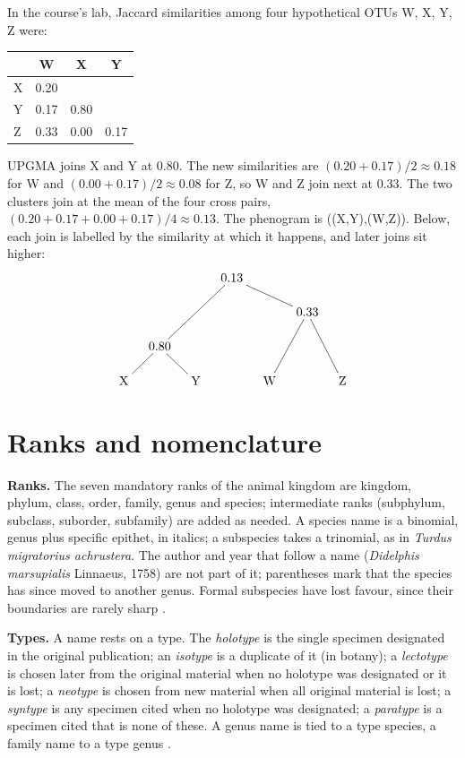 \begin{example}
\label{example-upgma}
In the course's lab, Jaccard similarities
among four hypothetical OTUs W, X, Y, Z
were:
\begin{center}
\begin{tabular}{lccc}
 & W & X & Y \\
\hline
X & 0.20 & & \\
Y & 0.17 & 0.80 & \\
Z & 0.33 & 0.00 & 0.17
\end{tabular}
\end{center}
UPGMA joins X and Y at 0.80. The new
similarities are $(0.20+0.17)/2 \approx
0.18$ for W and $(0.00+0.17)/2 \approx
0.08$ for Z, so W and Z join next at
0.33. The two clusters join at the mean of
the four cross pairs,
$(0.20+0.17+0.00+0.17)/4 \approx 0.13$.
The phenogram is ((X,Y),(W,Z)). Below,
each join is labelled by the similarity
at which it happens, and later joins sit
higher:
$$
\xymatrix@C=1em@R=1.5em{
& & & 0.13 \ar@{-}[ddll]
\ar@{-}[drr] & & & \\
& & & & & 0.33 \ar@{-}[ddl]
\ar@{-}[ddr] & \\
& 0.80 \ar@{-}[dl] \ar@{-}[dr] & & & & & \\
\mathrm{X} & & \mathrm{Y} & & \mathrm{W} & &
\mathrm{Z}
}
$$
\end{example}

\section{Ranks and nomenclature}
\label{section-nomenclature}

\textbf{Ranks.} The seven mandatory
ranks of the animal kingdom are kingdom,
phylum, class, order, family, genus and
species; intermediate ranks (subphylum,
subclass, suborder, subfamily) are added
as needed. A species name is a binomial,
genus plus specific epithet, in italics; a
subspecies takes a trinomial, as in
\emph{Turdus migratorius achrustera}. The
author and year that follow a name
(\emph{Didelphis marsupialis} Linnaeus,
1758) are not part of it; parentheses
mark that the species has since moved to
another genus. Formal subspecies have
lost favour, since their boundaries are
rarely sharp
\cite[Chapter 4]{hickman2002animal}.

\textbf{Types.} A name rests on a type.
The \emph{holotype} is the single specimen
designated in the original publication; an
\emph{isotype} is a duplicate of it (in
botany); a \emph{lectotype} is chosen
later from the original material when no
holotype was designated or it is lost; a
\emph{neotype} is chosen from new material
when all original material is lost; a
\emph{syntype} is any specimen cited when
no holotype was designated; a
\emph{paratype} is a specimen cited that
is none of these. A genus name is tied to
a type species, a family name to a type
genus \cite[Chapter 16]{simpson2006plant}.

